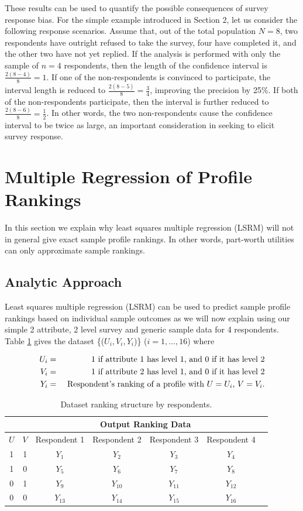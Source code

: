 \documentclass[a4paper, 12pt]{article}
\begin{document}
These results can be used to quantify the possible consequences of survey response bias. For the simple example introduced in Section 2, let us consider the following response scenarios. Assume that, out of the total population $N=8$, two respondents have outright refused to take the survey, four have completed it, and the other two have not yet replied. If the analysis is performed with only the sample of $n=4$ respondents, then the length of the confidence interval is  $\frac{2(8-4)}{8}=1$. If one of the non-respondents is convinced to participate, the interval length is reduced to $\frac{2(8-5)}{8}=\frac{3}{4}$, improving the precision by 25\%. If both of the non-respondents participate, then the interval is further reduced to $\frac{2(8-6)}{8}=\frac{1}{2}$. In other words, the two non-respondents  cause the confidence interval to be twice as large, an important consideration in seeking to elicit survey response.          

\section{Multiple Regression of Profile Rankings}
In this section we explain why  least squares multiple  regression (LSRM) will not in general give exact sample profile rankings. In other words, part-worth utilities can only approximate sample rankings.


\subsection{Analytic Approach}

Least squares multiple regression (LSRM) can be used to predict sample profile rankings based on individual sample outcomes as we will now explain using our simple 2 attribute, 2 level survey and generic sample data for 4 respondents. Table \ref{Tab7} gives the dataset \{($U_i,V_i,Y_i$)\} ($i = 1,...,16$) where

\begin{eqnarray*}
U_i&=& 1 \textup{ if attribute 1 has level 1, and 0 if it has level 2}\\
V_i&=& 1 \textup{ if attribute 2 has level 1, and 0 if it has level 2}\\
Y_i&=& \textup{ Respondent's ranking of a profile with $U=U_i$, $V=V_i$.}
\end{eqnarray*} 

\begin{table}[!htpb]
\centering
\small
\begin{tabular}{cc|ccccc}
\multicolumn{2}{c}{} &\multicolumn{4}{c}{Output Ranking Data}\\\hline
 $U$ & $V$ & Respondent 1&  Respondent 2& Respondent 3& Respondent 4\\  \hline
 1 &1&$Y_1$&$Y_2$&$Y_3$&$Y_4$\\
 1 &0&$Y_5$&$Y_6$&$Y_7$&$Y_8$ \\
 0 &1&$Y_9$&$Y_{10}$&$Y_{11}$&$Y_{12}$ \\
 0 &0&$Y_{13}$&$Y_{14}$&$Y_{15}$&$Y_{16}$ \\\hline
\end{tabular}
\caption{{\small Dataset ranking structure by respondents.}}
\label{Tab7}
\end{table}
\end{document}

